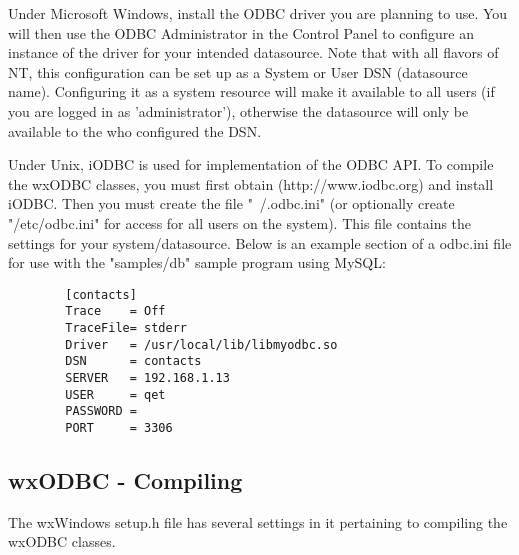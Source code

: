 Under Microsoft Windows, install the ODBC driver you are planning to use.  You 
will then use the ODBC Administrator in the Control Panel to configure an 
instance of the driver for your intended datasource.  Note that with all 
flavors of NT, this configuration can be set up as a System or User DSN 
(datasource name).  Configuring it as a system resource will make it 
available to all users (if you are logged in as 'administrator'), otherwise 
the datasource will only be available to the who configured the DSN.

Under Unix, iODBC is used for implementation of the ODBC API.  To compile the 
wxODBC classes, you must first obtain (http://www.iodbc.org) and install iODBC.  
Then you must create the file "~/.odbc.ini" (or optionally create 
"/etc/odbc.ini" for access for all users on the system).  This file contains 
the settings for your system/datasource.  Below is an example section of a 
odbc.ini file for use with the "samples/db" sample program using MySQL:

\begin{verbatim}
        [contacts]
        Trace    = Off
        TraceFile= stderr
        Driver   = /usr/local/lib/libmyodbc.so
        DSN      = contacts
        SERVER   = 192.168.1.13
        USER     = qet
        PASSWORD = 
        PORT     = 3306
\end{verbatim}



\subsection{wxODBC - Compiling}\label{wxodbccompiling}

The wxWindows setup.h file has several settings in it pertaining to compiling 
the wxODBC classes.

